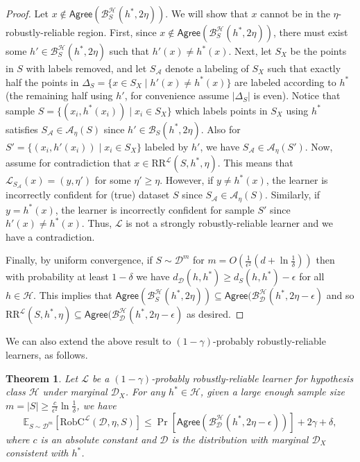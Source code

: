 \documentclass[11pt]{article}
\newcommand{\CR}{\text{RR}}
\newtheorem{theorem}{Theorem}[section]
\newcommand{\0}{\mathbf{0}}
\newcommand{\1}{\mathbf{1}}
\newcommand{\cA}{\mathcal{A}}
\newcommand{\cB}{\mathcal{B}}
\newcommand{\cD}{\mathcal{D}}
\newcommand{\cH}{\mathcal{H}}
\newcommand{\cL}{\mathcal{L}}
\newcommand{\bbE}{\mathbb{E}}
\newcommand{\Agree}{\mathsf{Agree}}
\begin{document}
\begin{proof}
Let $x \not\in \Agree(\cB_{S}^\cH(h^*,2\eta))$.  We will show that $x$ cannot be in the $\eta$-robustly-reliable region.  First, since $x \not\in \Agree(\cB_{S}^\cH(h^*,2\eta))$, there must exist some $h' \in \cB_{S}^\cH(h^*,2\eta)$ such that $h'(x) \neq h^*(x)$. Next, let $S_X$ be the points in $S$ with labels removed, and let $S_\cA$ denote a labeling of $S_X$ such that exactly half the points in $\Delta_S=\{x\in S_X\mid h'(x)\ne h^*(x)\}$ are labeled according to $h^*$ (the remaining half using $h'$, for convenience assume $|\Delta_S|$ is even). Notice that sample $S=\{(x_i,h^*(x_i)) \mid x_i\in S_X\}$ which labels points in $S_X$ using $h^*$ satisfies $S_\cA\in\cA_\eta(S)$ since $h'\in \cB_{S}(h^*,2\eta)$. Also for $S'=\{(x_i,h'(x_i))\mid x_i\in S_X\}$ labeled by $h'$, we have $S_\cA\in\cA_\eta(S')$. Now, assume for contradiction that $x \in \CR^\cL(S,h^*,\eta)$.  This means that $\cL_{S_\cA}(x)=(y,\eta')$ for some $\eta'\geq \eta$.  However, if $y\ne h^*(x)$, the learner is incorrectly confident for (true) dataset $S$ since $S_\cA\in\cA_\eta(S)$.
Similarly, if $y=h^*(x)$, the learner is incorrectly confident for sample $S'$ since $h'(x)\ne h^*(x)$. Thus, $\cL$ is not a strongly robustly-reliable learner and we have a contradiction.

Finally, {by uniform convergence},
if $S\sim \cD^m$ for $m=O(\frac{1}{\epsilon^2}(d+\ln\frac{1}{\delta}))$ then with probability at least $1-\delta$ we have $d_\cD(h,h^*)\ge d_S(h,h^*)-\epsilon$ for all $h \in \cH$.  This implies that
$\Agree(\cB_S^\cH(h^*,2\eta)) \subseteq \Agree(\cB_\cD^\cH(h^*,2\eta-\epsilon)$
and so $\CR^\cL(S,h^*,\eta) \subseteq \Agree(\cB_\cD^\cH(h^*,2\eta-\epsilon)$ as desired.
\end{proof}

We can also extend the above result to $(1-\gamma)$-probably robustly-reliable learners, as follows.

\begin{theorem}
Let $\cL$ be a $(1-\gamma)$-probably robustly-reliable learner for hypothesis class $\cH$ under marginal $\cD_X$. For any $h^*\in\cH$, given a large enough sample size $m=|S|\ge\frac{c}{\epsilon^2}\ln\frac{1}{\delta}$, we have
$$\bbE_{S\sim\cD^m}[\text{RobC}^\cL(\cD,\eta,S)]\le \Pr[\Agree(\cB_\cD^\cH(h^*,2\eta-\epsilon))]+2\gamma+\delta,$$
where $c$ is an absolute constant and $\cD$ is the distribution with marginal $\cD_X$ consistent with $h^*$.
\label{thm:probably_robustly-reliable_lower_bound_distributional}
\end{theorem}
\end{document}
